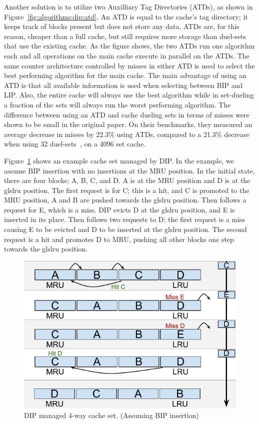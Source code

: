 Another solution is to utilize two Auxilliary Tag Directories (ATDs), as shown in Figure~\ref{fig:algorithms:dip:atd}.
An ATD is equal to the cache's tag directory; it keeps track of blocks present but does not store any data.
ATDs are, for this reason, cheaper than a full cache, but still requires more storage than duel-sets that use the existing cache.
As the figure shows, the two ATDs run one algorithm each and all operations on the main cache execute in parallel on the ATDs.
The same counter architecture controlled by misses in either ATD is used to select the best performing algorithm for the main cache.
The main advantage of using an ATD is that all available information is used when selecting between BIP and LIP.
Also, the entire cache will always use the best algorithm while in set-dueling a fraction of the sets will always run the worst performing algorithm.
The difference between using an ATD and cache dueling sets in terms of misses were shown to be small in the original paper.
On their benchmarks, they measured an average decrease in misses by 22.3\% using ATDs, compared to a 21.3\% decrease when using 32 duel-sets~\cite{Qureshi2007}, on a 4096 set cache.

Figure~\ref{fig:algorithms:bip_example} shows an example cache set managed by DIP.
In the example, we assume BIP insertion with no insertions at the MRU position.
In the initial state, there are four blocks; A, B, C, and D.
A is at the MRU position and D is at the gls{lru} position.
The first request is for C; this is a hit, and C is promoted to the MRU position, A and B are pushed towards the gls{lru} position.
Then follows a request for E, which is a miss.
DIP evicts D at the gls{lru} position, and E is inserted in its place.
Then follows two requests to D; the first request is a miss causing E to be evicted and D to be inserted at the gls{lru} position.
The second request is a hit and promotes D to MRU, pushing all other blocks one step towards the gls{lru} position.

\begin{figure}[ht]
    \centering
    \includegraphics[width=.65\textwidth]{figures/algorithms/DIP}
    \caption[DIP managed 4-way cache set.]{DIP managed 4-way cache set. (Assuming BIP insertion)}
    \label{fig:algorithms:bip_example}
\end{figure}
